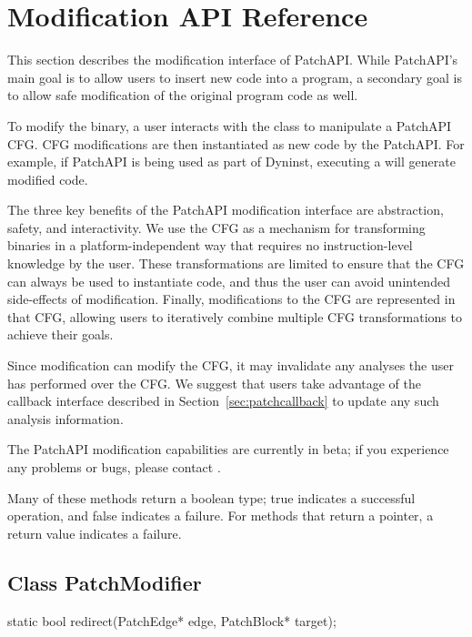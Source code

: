 \section{Modification API Reference}
\label{sec:modification-api}

This section describes the modification interface of PatchAPI. While
PatchAPI's main goal is to allow users to insert new code into a
program, a secondary goal is to allow safe modification of the
original program code as well.

To modify the binary, a user interacts with the 
class to manipulate a PatchAPI CFG. CFG modifications are then
instantiated as new code by the PatchAPI. For example, if PatchAPI is
being used as part of Dyninst, executing a 
will generate modified code.

The three key benefits of the PatchAPI modification interface are
abstraction, safety, and interactivity. We use the CFG as a mechanism
for transforming binaries in a platform-independent way that requires
no instruction-level knowledge by the user. These transformations are
limited to ensure that the CFG can always be used to instantiate code,
and thus the user can avoid unintended side-effects of
modification. Finally, modifications to the CFG are represented in
that CFG, allowing users to iteratively combine multiple CFG
transformations to achieve their goals.

Since modification can modify the CFG, it may invalidate any analyses
the user has performed over the CFG. We suggest that users take
advantage of the callback interface described in Section~\ref{sec:patchcallback} to update any such analysis information.

The PatchAPI modification capabilities are currently in beta; if you
experience any problems or bugs, please contact .

Many of these methods return a boolean type; true indicates a
successful operation, and false indicates a failure. For methods that
return a pointer, a  return value indicates a failure.

\subsection{Class PatchModifier}

\begin{apient}
static bool redirect(PatchEdge* edge, PatchBlock* target);
\end{apient}

